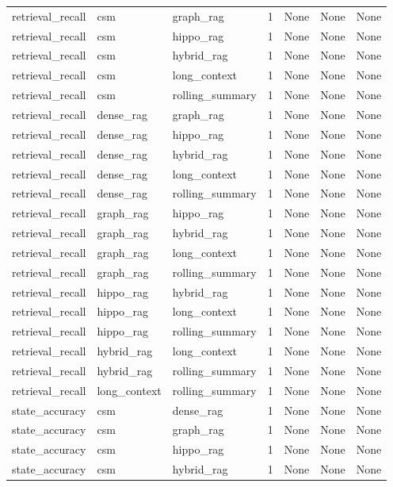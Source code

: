 \begin{tabular}{lllllll}
retrieval\_recall & csm & graph\_rag & 1 & None & None & None \\
retrieval\_recall & csm & hippo\_rag & 1 & None & None & None \\
retrieval\_recall & csm & hybrid\_rag & 1 & None & None & None \\
retrieval\_recall & csm & long\_context & 1 & None & None & None \\
retrieval\_recall & csm & rolling\_summary & 1 & None & None & None \\
retrieval\_recall & dense\_rag & graph\_rag & 1 & None & None & None \\
retrieval\_recall & dense\_rag & hippo\_rag & 1 & None & None & None \\
retrieval\_recall & dense\_rag & hybrid\_rag & 1 & None & None & None \\
retrieval\_recall & dense\_rag & long\_context & 1 & None & None & None \\
retrieval\_recall & dense\_rag & rolling\_summary & 1 & None & None & None \\
retrieval\_recall & graph\_rag & hippo\_rag & 1 & None & None & None \\
retrieval\_recall & graph\_rag & hybrid\_rag & 1 & None & None & None \\
retrieval\_recall & graph\_rag & long\_context & 1 & None & None & None \\
retrieval\_recall & graph\_rag & rolling\_summary & 1 & None & None & None \\
retrieval\_recall & hippo\_rag & hybrid\_rag & 1 & None & None & None \\
retrieval\_recall & hippo\_rag & long\_context & 1 & None & None & None \\
retrieval\_recall & hippo\_rag & rolling\_summary & 1 & None & None & None \\
retrieval\_recall & hybrid\_rag & long\_context & 1 & None & None & None \\
retrieval\_recall & hybrid\_rag & rolling\_summary & 1 & None & None & None \\
retrieval\_recall & long\_context & rolling\_summary & 1 & None & None & None \\
state\_accuracy & csm & dense\_rag & 1 & None & None & None \\
state\_accuracy & csm & graph\_rag & 1 & None & None & None \\
state\_accuracy & csm & hippo\_rag & 1 & None & None & None \\
state\_accuracy & csm & hybrid\_rag & 1 & None & None & None \\

\end{tabular}

